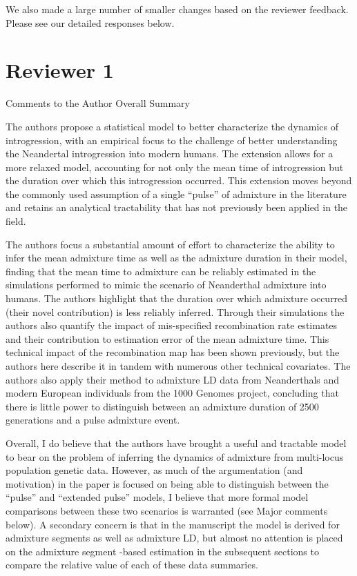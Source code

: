 \documentclass[11pt]{article}
\begin{document}
We also made a large number of smaller changes based on the reviewer feedback. Please see our detailed responses below.

\section{Reviewer 1}\label{Reviewer 1}
Comments to the Author
Overall Summary 

The authors propose a statistical model to better characterize the dynamics of introgression, with an empirical focus to the challenge of better understanding the Neandertal introgression into modern humans. The extension allows for a more relaxed model, accounting for not only the mean time of introgression but the duration over which this introgression occurred. This extension moves beyond the commonly used assumption of a single “pulse” of admixture in the literature and retains an analytical tractability that has not previously been applied in the field. 

The authors focus a substantial amount of effort to characterize the ability to infer the mean admixture time as well as the admixture duration in their model, finding that the mean time to admixture can be reliably estimated in the simulations performed to mimic the scenario of Neanderthal admixture into humans. The authors highlight that the duration over which admixture occurred (their novel contribution) is less reliably inferred. Through their simulations the authors also quantify the impact of mis-specified recombination rate estimates and their contribution to estimation error of the mean admixture time. This technical impact of the recombination map has been shown previously, but the authors here describe it in tandem with numerous other technical covariates.  The authors also apply their method to admixture LD data from Neanderthals and modern European individuals from the 1000 Genomes project,  concluding that there is little power to distinguish between an admixture duration of 2500 generations and a pulse admixture event. 

Overall, I do believe that the authors have brought a useful and tractable model to bear on the problem of inferring the dynamics of admixture from multi-locus population genetic data. However, as much of the argumentation (and motivation) in the paper is focused on being able to distinguish between the “pulse” and “extended pulse” models, I believe that more formal model comparisons between these two scenarios is warranted (see Major comments below). A secondary concern is that in the manuscript the model is derived for admixture segments as well as admixture LD, but almost no attention is placed on the admixture segment -based estimation in the subsequent sections to compare the relative value of each of these data summaries.
\end{document}
